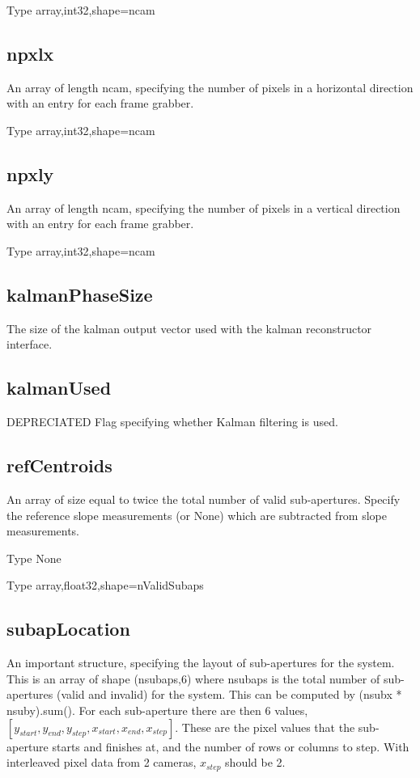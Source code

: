 \documentclass[a4,10pt]{article}
\begin{document}
Type array,int32,shape=ncam

\subsection{npxlx}
An array of length ncam, specifying the number of pixels in a
horizontal direction with an entry for each frame grabber.

Type array,int32,shape=ncam

\subsection{npxly}
An array of length ncam, specifying the number of pixels in a
vertical direction with an entry for each frame grabber.

Type array,int32,shape=ncam

\subsection{kalmanPhaseSize}
The size of the kalman output vector used with the kalman
reconstructor interface.

\subsection{kalmanUsed}
DEPRECIATED Flag specifying whether Kalman filtering is used.

\subsection{refCentroids}
An array of size equal to twice the total number of valid sub-apertures.  Specify the
reference slope measurements (or None) which are subtracted from slope
measurements.

Type None

Type array,float32,shape=nValidSubaps

\subsection{subapLocation}
An important structure, specifying the layout of sub-apertures for the
system.  This is an array of shape (nsubaps,6) where nsubaps is the
total number of sub-apertures (valid and invalid) for the system.
This can be computed by (nsubx * nsuby).sum().  For each sub-aperture
there are then 6 values,
$[y_{start},y_{end},y_{step},x_{start},x_{end},x_{step}]$.  These are
the pixel values that the sub-aperture starts and finishes at, and the
number of rows or columns to step.  With interleaved pixel data from 2
cameras, $x_{step}$ should be 2.  
\end{document}
